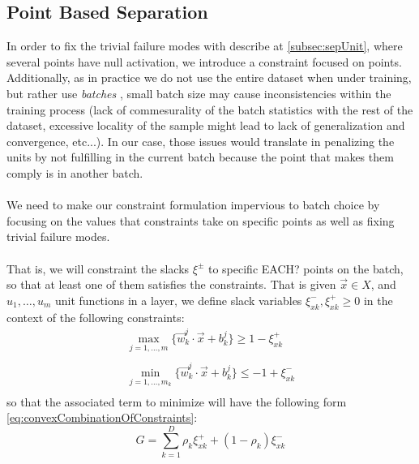 \subsection{Point Based Separation \SepPoint}\label{subsec:sepPoint}

In order to fix the trivial failure modes with \SepUnit describe at \ref{subsec:sepUnit}, where several points have null activation, we introduce a constraint focused on points. Additionally, as in practice we do not use the entire dataset when under training, but rather use \emph{batches} \cite{LeCun06atutorial}, small batch size may cause inconsistencies within the training process (lack of commesurality of the batch statistics with the rest of the dataset, excessive locality of the sample might lead to lack of generalization and convergence, etc...). In our case, those issues would translate in penalizing the units by not fulfilling \SepUnit in the current batch because the point that makes them comply is in another batch.  
\\\\
We need to make our constraint formulation impervious to batch choice by focusing on the values that constraints take on specific points as well as fixing trivial failure modes. 
\\\\
That is, we will constraint the slacks $\xi^{\pm}$ to specific EACH? points on the batch, so that at least one of them satisfies the constraints. That is given $\vec{x}\in X$, and $u_1,\ldots,u_m$ unit functions in a layer, we define slack variables $\xi^{-}_{xk},\xi^{+}_{xk}\geq 0$ in the context of the following constraints:
\begin{equation}\label{eq:pointSeparationConstraint}
\begin{array}{lcl}
    \displaystyle\max_{j=1,\ldots,m}\{\vec{w}^j_k\cdot\vec{x}+b^j_k\}\geq 1-\xi^{+}_{xk}\\\\
    \displaystyle\min_{j=1,\ldots,m_k}\{\vec{w}^j_k\cdot\vec{x}+b^j_k\}\leq -1+\xi^{-}_{xk}\\
\end{array}    
\end{equation}
so that the associated term to minimize will have the following form \ref{eq:convexCombinationOfConstraints}:
\begin{equation}\label{eq:convexCombinationOfConstraints}
    G = \sum_{k=1}^{D}\rho_{k}\xi^{+}_{xk}+(1-\rho_{k})\xi^{-}_{xk}
\end{equation}

